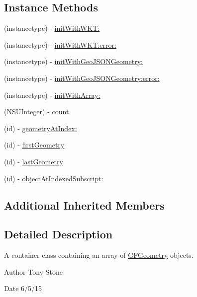 \subsection*{Instance Methods}
\begin{DoxyCompactItemize}
\item 
(instancetype) -\/ \hyperlink{interface_g_f_geometry_collection_a13156620e5298fe7d286bb800df4097b}{init\+With\+W\+K\+T\+:}
\item 
(instancetype) -\/ \hyperlink{interface_g_f_geometry_collection_a7569568bacbb3b0f73c60369a0dc710e}{init\+With\+W\+K\+T\+:error\+:}
\item 
(instancetype) -\/ \hyperlink{interface_g_f_geometry_collection_adc8a317a694f82808d1e02e53e300f8f}{init\+With\+Geo\+J\+S\+O\+N\+Geometry\+:}
\item 
(instancetype) -\/ \hyperlink{interface_g_f_geometry_collection_a74b596f60b3363bb9f06b06847cb086d}{init\+With\+Geo\+J\+S\+O\+N\+Geometry\+:error\+:}
\item 
(instancetype) -\/ \hyperlink{interface_g_f_geometry_collection_a260bb3daa9d3324cb1cc2fa9ef3a61e9}{init\+With\+Array\+:}
\item 
(N\+S\+U\+Integer) -\/ \hyperlink{interface_g_f_geometry_collection_a020dd5245b572a391ccbd1ea92699240}{count}
\item 
(id) -\/ \hyperlink{interface_g_f_geometry_collection_a4cd182279facec2850b47634aa0f6297}{geometry\+At\+Index\+:}
\item 
(id) -\/ \hyperlink{interface_g_f_geometry_collection_a610f72a22d76a3ce6c9eaeb2dad35c0e}{first\+Geometry}
\item 
(id) -\/ \hyperlink{interface_g_f_geometry_collection_a89b3b6e2097cf5899a6d635ddcb95ef3}{last\+Geometry}
\item 
(id) -\/ \hyperlink{interface_g_f_geometry_collection_ac67dd4526580a8a38408e39c489a7503}{object\+At\+Indexed\+Subscript\+:}
\end{DoxyCompactItemize}
\subsection*{Additional Inherited Members}


\subsection{Detailed Description}
A container class containing an array of \hyperlink{interface_g_f_geometry}{G\+F\+Geometry} objects. 

\begin{DoxyAuthor}{Author}
Tony Stone 
\end{DoxyAuthor}
\begin{DoxyDate}{Date}
6/5/15 
\end{DoxyDate}



